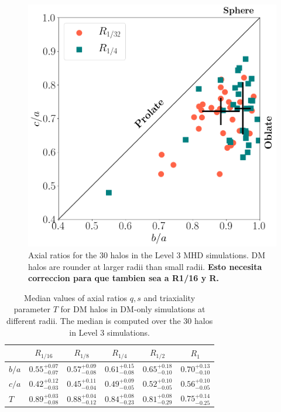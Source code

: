 \documentclass[a4paper,fleqn,usenatbib]{mnras}
\begin{document}
\begin{figure}
 \includegraphics[width=0.9\columnwidth]{./pics/Triaxial_Plane/Triax_MHD.png}
  \caption{Axial ratios for the 30 halos in the Level 3 MHD
    simulations. DM halos are rounder at larger radii than small radii. {\bf Esto
      necesita correccion para que tambien sea a 
      R1/16 y R.}}
  \label{fig:triax_MHD}
\end{figure}



\begin{table}
\setlength{\tabcolsep}{3pt}
\begin{center}
\begin{tabular}{l|ccccc}
 &$R_{1/16}$& $R_{1/8}$& $R_{1/4}$& $R_{1/2}$& $R_1$\\
\hline 
$b/a$ &$0.55^{+0.07}_{-0.07}$&$0.57^{+0.09}_{-0.08}$&$0.61^{+0.15}_{-0.08}$&$0.65^{+0.18}_{-0.10}$&$0.70^{+0.13}_{-0.10}$ \\ [0.1cm]
$c/a$ &$0.42^{+0.12}_{-0.03}$&$0.45^{+0.11}_{-0.04}$&$0.49^{+0.09}_{-0.05}$&$0.52^{+0.10}_{-0.05}$&$0.56^{+0.10}_{-0.05}$\\ [0.1cm]
$T$ &$0.89^{+0.03}_{-0.08}$&$0.88^{+0.04}_{-0.12}$&$0.84^{+0.08}_{-0.23}$&$0.81^{+0.08}_{-0.29}$&$0.75^{+0.14}_{-0.25}$\\ [0.1cm]
\end{tabular}
\end{center}
\caption{Median values of axial ratios $q,s$ and triaxiality parameter
  $T$ for DM halos in DM-only simulations at different radii. The
  median is computed over the 30 halos in Level 3 simulations.}  
\label{table:median_axial_ratio_DM}
\end{table}
\end{document}
